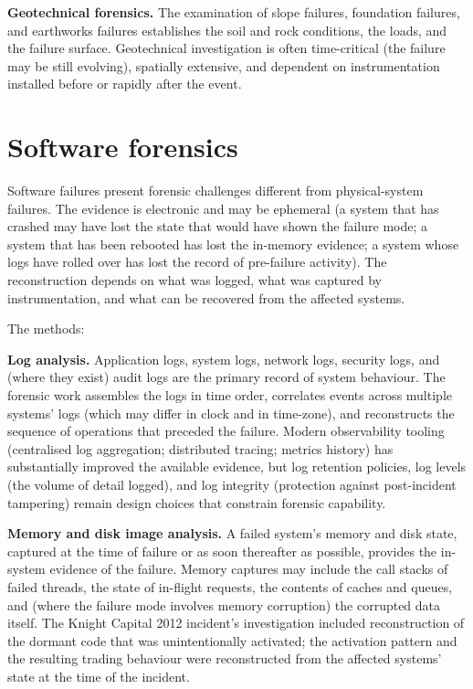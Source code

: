 \textbf{Geotechnical forensics.} The examination of slope failures, foundation failures, and earthworks failures establishes the soil and rock conditions, the loads, and the failure surface. Geotechnical investigation is often time-critical (the failure may be still evolving), spatially extensive, and dependent on instrumentation installed before or rapidly after the event.

\section{Software forensics}

Software failures present forensic challenges different from physical-system failures. The evidence is electronic and may be ephemeral (a system that has crashed may have lost the state that would have shown the failure mode; a system that has been rebooted has lost the in-memory evidence; a system whose logs have rolled over has lost the record of pre-failure activity). The reconstruction depends on what was logged, what was captured by instrumentation, and what can be recovered from the affected systems.

The methods:

\textbf{Log analysis.} Application logs, system logs, network logs, security logs, and (where they exist) audit logs are the primary record of system behaviour. The forensic work assembles the logs in time order, correlates events across multiple systems' logs (which may differ in clock and in time-zone), and reconstructs the sequence of operations that preceded the failure. Modern observability tooling (centralised log aggregation; distributed tracing; metrics history) has substantially improved the available evidence, but log retention policies, log levels (the volume of detail logged), and log integrity (protection against post-incident tampering) remain design choices that constrain forensic capability.

\textbf{Memory and disk image analysis.} A failed system's memory and disk state, captured at the time of failure or as soon thereafter as possible, provides the in-system evidence of the failure. Memory captures may include the call stacks of failed threads, the state of in-flight requests, the contents of caches and queues, and (where the failure mode involves memory corruption) the corrupted data itself. The Knight Capital 2012 incident's investigation included reconstruction of the dormant code that was unintentionally activated; the activation pattern and the resulting trading behaviour were reconstructed from the affected systems' state at the time of the incident.

